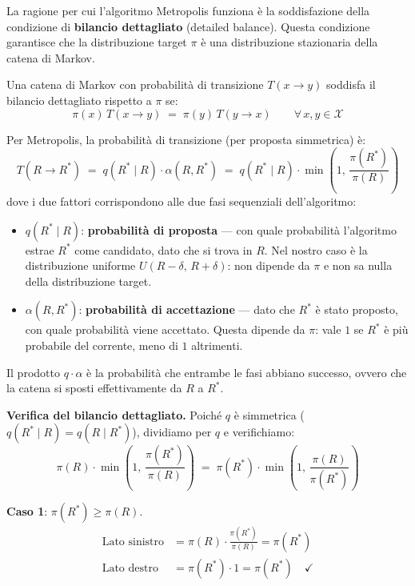 \documentclass[12pt,a4paper]{article}
\begin{document}
La ragione per cui l'algoritmo Metropolis funziona è la soddisfazione della condizione
di \textbf{bilancio dettagliato} (detailed balance). Questa condizione garantisce che la
distribuzione target $\pi$ è una distribuzione stazionaria della catena di Markov.

\begin{definizione}[title=Definizione: bilancio dettagliato]
Una catena di Markov con probabilità di transizione $T(x \to y)$ soddisfa il bilancio
dettagliato rispetto a $\pi$ se:
\begin{equation}
  \pi(x)\, T(x \to y) \;=\; \pi(y)\, T(y \to x) \qquad \forall\, x, y \in \mathcal{X}
  \label{eq:bd}
\end{equation}
\end{definizione}

Per Metropolis, la probabilità di transizione (per proposta simmetrica) è:
\begin{equation}
  T(R \to R^*) \;=\; q(R^*\mid R)\cdot \alpha(R, R^*)
  \;=\; q(R^*\mid R)\cdot \min\!\left(1,\, \frac{\pi(R^*)}{\pi(R)}\right)
\end{equation}
dove i due fattori corrispondono alle due fasi sequenziali dell'algoritmo:
\begin{itemize}
  \item $q(R^*\mid R)$: \textbf{probabilità di proposta} --- con quale probabilità l'algoritmo
        estrae $R^*$ come candidato, dato che si trova in $R$. Nel nostro caso è la distribuzione
        uniforme $U(R-\delta,\, R+\delta)$: non dipende da $\pi$ e non sa nulla della
        distribuzione target.
  \item $\alpha(R, R^*)$: \textbf{probabilità di accettazione} --- dato che $R^*$ è stato proposto,
        con quale probabilità viene accettato. Questa dipende da $\pi$: vale $1$ se
        $R^*$ è più probabile del corrente, meno di $1$ altrimenti.
\end{itemize}
Il prodotto $q \cdot \alpha$ è la probabilità che entrambe le fasi abbiano successo,
ovvero che la catena si sposti effettivamente da $R$ a $R^*$.

\textbf{Verifica del bilancio dettagliato.} Poiché $q$ è simmetrica ($q(R^*\mid R) = q(R\mid R^*)$),
dividiamo per $q$ e verifichiamo:
\begin{equation}
  \pi(R)\cdot \min\!\left(1,\, \frac{\pi(R^*)}{\pi(R)}\right)
  \;=\;
  \pi(R^*)\cdot \min\!\left(1,\, \frac{\pi(R)}{\pi(R^*)}\right)
\end{equation}

\textbf{Caso 1}: $\pi(R^*) \ge \pi(R)$.
\begin{align*}
  \text{Lato sinistro} &= \pi(R)\cdot \frac{\pi(R^*)}{\pi(R)} = \pi(R^*) \\
  \text{Lato destro}  &= \pi(R^*)\cdot 1 = \pi(R^*) \quad \checkmark
\end{align*}
\end{document}
